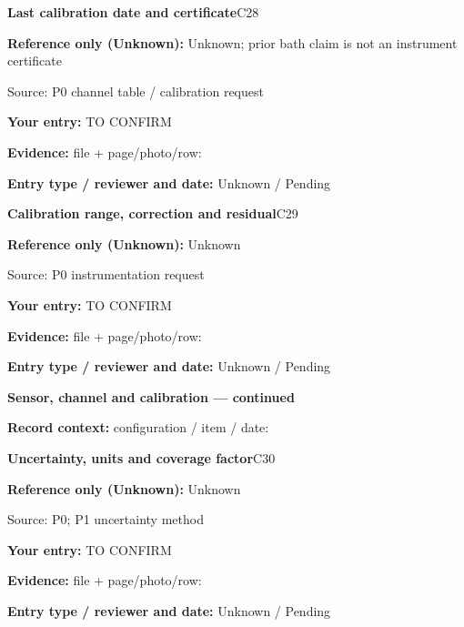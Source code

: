 \documentclass[11pt]{article}
\begin{document}
\par\noindent\begin{minipage}{\textwidth}\small
{\color{navy}\bfseries Last calibration date and certificate}\hfill C28\par
\colorbox{pale}{\parbox{\dimexpr\linewidth-2\fboxsep\relax}{
\textbf{Reference only (Unknown):} Unknown; prior bath claim is not an instrument certificate\par
{\footnotesize Source: P0 channel table / calibration request}}}\par
\textbf{Your entry:} {\color{muted}TO CONFIRM}\enspace\hrulefill\par
{\footnotesize\textbf{Evidence:} file + page/photo/row: \hrulefill\par
\textbf{Entry type / reviewer and date:} Unknown / Pending\par
}\end{minipage}\par\vspace{5pt}
\par\noindent\begin{minipage}{\textwidth}\small
{\color{navy}\bfseries Calibration range, correction and residual}\hfill C29\par
\colorbox{pale}{\parbox{\dimexpr\linewidth-2\fboxsep\relax}{
\textbf{Reference only (Unknown):} Unknown\par
{\footnotesize Source: P0 instrumentation request}}}\par
\textbf{Your entry:} {\color{muted}TO CONFIRM}\enspace\hrulefill\par
{\footnotesize\textbf{Evidence:} file + page/photo/row: \hrulefill\par
\textbf{Entry type / reviewer and date:} Unknown / Pending\par
}\end{minipage}\par\vspace{5pt}
\clearpage
{\large\bfseries Sensor, channel and calibration --- continued}\par
\textbf{Record context:} configuration / item / date: \hrulefill\par
\par\noindent\begin{minipage}{\textwidth}\small
{\color{navy}\bfseries Uncertainty, units and coverage factor}\hfill C30\par
\colorbox{pale}{\parbox{\dimexpr\linewidth-2\fboxsep\relax}{
\textbf{Reference only (Unknown):} Unknown\par
{\footnotesize Source: P0; P1 uncertainty method}}}\par
\textbf{Your entry:} {\color{muted}TO CONFIRM}\enspace\hrulefill\par
{\footnotesize\textbf{Evidence:} file + page/photo/row: \hrulefill\par
\textbf{Entry type / reviewer and date:} Unknown / Pending\par
}\end{minipage}\par\vspace{5pt}
\end{document}
